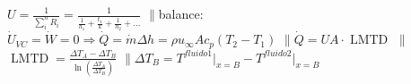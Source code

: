 \documentclass{article}
\newcommand{\cp}{c_p}
\newcommand{\dQ}{\dot{Q}}
\newcommand{\dW}{\dot{W}}
\newcommand{\LMTD}{\operatorname{LMTD}}
\newcommand{\separar}{\ensuremath{\pmb{  \parallel{} }}}
\begin{document}
\vspace{\formuleoseparator}
\begin{formuleo}[Intercambiadores]
 $U=\frac{1}{\sum_i^n R_i}=\frac{1}{\frac{1}{h_1}+\frac{t_1}{k}+\frac{1}{h_2}+\ldots }$ \separar balance: $\dot{U}_{VC}=\dW =0 \Rightarrow \dot{Q} = \dot{m} \Delta h = \rho u_{\infty} A \cp  (T_2-T_1)$ 
\newline
\separar $\dQ = U A \cdot \LMTD $ \separar $\LMTD=\frac{\Delta T_{A}-\Delta T_{B}}{\ln \left(\frac{\Delta T_{A}}{\Delta T_{B}}\right)}$ \separar $\Delta T_{B} = T^{fluido 1}\big|_{x=B}-T^{fluido 2}\big|_{x=B}$
\end{formuleo}
\end{document}
